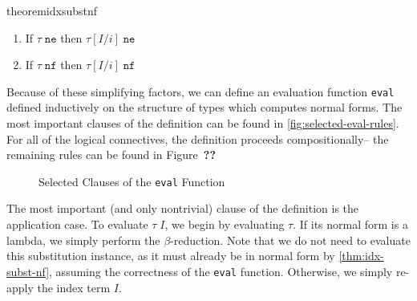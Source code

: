 


\begin{restatable}{theorem}{idxsubstnf}
\label{thm:idx-subst-nf}
~\begin{enumerate}
  \item If $\tau \; \texttt{ne}$ then $\tau[I/i] \; \texttt{ne}$
  \item If $\tau \; \texttt{nf}$ then $\tau[I/i] \; \texttt{nf}$
\end{enumerate}
\end{restatable}

Because of these simplifying factors, we can define an evaluation function \texttt{eval} defined inductively on the structure of types which computes normal forms.
The most important clauses of the definition can be found in \autoref{fig:selected-eval-rules}. For all of the logical connectives, the definition proceeds compositionally-- the remaining rules can be found in Figure~\textbf{??}

\begin{figure}

\caption{Selected Clauses of the \texttt{eval} Function}
\label{fig:selected-eval-rules}
\end{figure}

The most important (and only nontrivial) clause of the definition is the application case. To evaluate $\tau \; I$, we begin by evaluating $\tau$. If its normal form
is a lambda, we simply perform the $\beta$-reduction. Note that we do not need to evaluate this substitution instance, as it must already be in normal form by \autoref{thm:idx-subst-nf}, assuming the correctness of the \texttt{eval} function. Otherwise, we simply re-apply the index term $I$.

